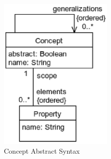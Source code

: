 \begin{figure}
\centering
\includegraphics[width=0.5\textwidth]{metamodel/concept}
\caption{Concept Abstract Syntax}
\label{fig:meta:concept}
\end{figure}

\begin{code}
\verbatimfont{\small}

\caption{Concept AST Instantiation}
\label{lst:ast:concept}
\end{code}
